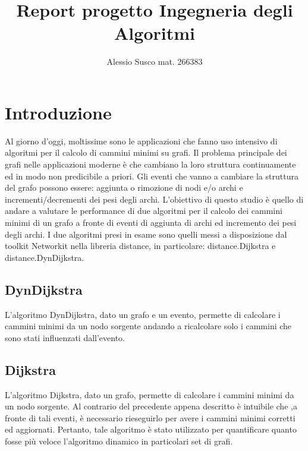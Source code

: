 \documentclass[a4paper]{article}
\begin{document}
\author{Alessio Susco mat. 266383}
\title{Report progetto Ingegneria degli Algoritmi}
\maketitle
\theoremstyle{definition}
\newtheorem{definition}{Definition}[section]
\newtheorem{theorem}{Theorem}
\section{Introduzione}
Al giorno d'oggi, moltissime sono le applicazioni che fanno uso intensivo di algoritmi per il calcolo di cammini minimi su grafi. Il problema principale dei grafi nelle applicazioni moderne è che cambiano la loro struttura continuamente ed in modo non predicibile a priori. Gli eventi che vanno a cambiare la struttura del grafo possono essere: aggiunta o rimozione di nodi e/o archi e incrementi/decrementi dei pesi degli archi.
L'obiettivo di questo studio è quello di andare a valutare le performance di due algoritmi per il calcolo dei cammini minimi di un grafo a fronte di eventi di aggiunta di archi ed incremento dei pesi degli archi.
I due algoritmi presi in esame sono quelli messi a disposizione dal toolkit Networkit nella libreria distance, in particolare: distance.Dijkstra e distance.DynDijkstra.
\subsection{DynDijkstra}
L'algoritmo DynDijkstra, dato un grafo e un evento, permette di calcolare i cammini minimi da un nodo sorgente andando a ricalcolare solo i cammini che sono stati influenzati dall'evento.
\subsection{Dijkstra}
L'algoritmo Dijkstra, dato un grafo, permette di calcolare i cammini minimi da un nodo sorgente.
Al contrario del precedente appena descritto è intuibile che ,a fronte di tali eventi, è necessario rieseguirlo per avere i cammini minimi corretti ed aggiornati. 
Pertanto, tale algoritmo è stato utilizzato per quantificare quanto fosse più veloce l'algoritmo dinamico in particolari set di grafi.
\end{document}
